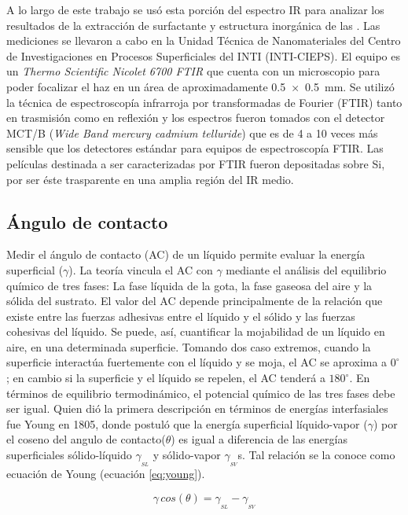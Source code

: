 		A lo largo de este trabajo se usó esta porción del espectro IR para analizar los resultados de la extracción de surfactante y estructura inorgánica de las \pdm. Las mediciones se llevaron a cabo en la Unidad Técnica de Nanomateriales del Centro de Investigaciones en Procesos Superficiales del INTI (INTI-CIEPS). El equipo es un \textit{Thermo Scientific Nicolet 6700 FTIR} que cuenta con un microscopio para poder focalizar el haz en un área de aproximadamente \SI{0.5x0.5}{\mm}. Se utilizó la técnica de espectroscopía infrarroja por transformadas de Fourier (FTIR) tanto en trasmisión como en reflexión y los espectros fueron tomados con el detector MCT/B (\textit{Wide Band mercury cadmium telluride}) que es de 4 a 10 veces más sensible que los detectores estándar para equipos de espectroscopía FTIR.\cite{Nicholet2007} Las películas destinada a ser caracterizadas por FTIR fueron depositadas sobre Si, por ser éste trasparente en una amplia región del IR medio.

	\subsection{Ángulo de contacto}

		Medir el ángulo de contacto (AC) de un líquido permite evaluar la energía superficial ($\gamma$). La teoría vincula el AC con $\gamma$ mediante el análisis del equilibrio químico de tres fases: La fase líquida de la gota, la fase gaseosa del aire y la sólida del sustrato. El valor del AC depende principalmente de la relación que existe entre las fuerzas adhesivas entre el líquido y el sólido y las fuerzas cohesivas del líquido. Se puede, así, cuantificar la mojabilidad de un líquido en aire, en una determinada superficie.\cite{findenegg1997} Tomando dos caso extremos, cuando la superficie interactúa fuertemente con el líquido y se moja, el AC se aproxima a $0^{\circ}$; en cambio si la superficie y el líquido se repelen, el AC tenderá a $180^{\circ}$. En términos de equilibrio termodinámico, el potencial químico de las tres fases  debe ser igual. Quien dió la primera descripción en términos de energías interfasiales fue Young en 1805\cite{young1805}, donde postuló que la energía superficial líquido-vapor ($\gamma$) por el coseno del angulo de contacto($\theta$) es igual a diferencia de las energías superficiales sólido-líquido $\gamma_{_{SL}}$ y sólido-vapor $\gamma_{_{SV}}$s. Tal relación se la conoce como ecuación de Young (ecuación \ref{eq:young}).

			\begin{equation}
				\gamma\, cos(\theta) = \gamma_{_{SL}} - \gamma_{_{SV}}
				\label{eq:young} 
				\end{equation}

